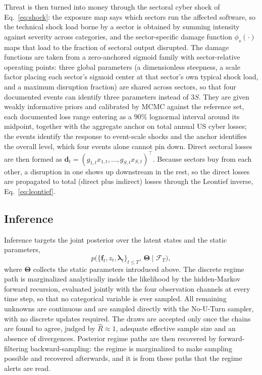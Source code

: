 \documentclass[review]{elsarticle}
\begin{document}
Threat is then turned into money through the sectoral cyber shock of Eq.~\ref{eq:shock}: the exposure map says which sectors run the affected software, so the technical shock load borne by a sector is obtained by summing intensity against severity across categories, and the sector-specific damage function $\phi_s(\cdot)$ maps that load to the fraction of sectoral output disrupted. The damage functions are taken from a zero-anchored sigmoid family with sector-relative operating points: three global parameters (a dimensionless steepness, a scale factor placing each sector's sigmoid center at that sector's own typical shock load, and a maximum disruption fraction) are shared across sectors, so that four documented events can identify three parameters instead of $3S$. They are given weakly informative priors and calibrated by MCMC against the reference set, each documented loss range entering as a $90\%$ lognormal interval around its midpoint, together with the aggregate anchor on total annual US cyber losses; the events identify the response to event-scale shocks and the anchor identifies the overall level, which four events alone cannot pin down. Direct sectoral losses are then formed as $\bm{d}_t = (g_{1,t} x_{1,t}, \dots, g_{S,t} x_{S,t})^\top$. Because sectors buy from each other, a disruption in one shows up downstream in the rest, so the direct losses are propagated to total (direct plus indirect) losses through the Leontief inverse, Eq.~\ref{eq:leontief}.

\subsection{Inference}

Inference targets the joint posterior over the latent states and the static parameters,
\[
    p\big( \{\bm{f}_t, z_t, \bm{\lambda}_t\}_{t \le T},\, \bm{\Theta} \mid \mathcal{F}_T \big),
\]
where $\bm{\Theta}$ collects the static parameters introduced above. The discrete regime path is marginalized analytically inside the likelihood by the hidden-Markov forward recursion, evaluated jointly with the four observation channels at every time step, so that no categorical variable is ever sampled. All remaining unknowns are continuous and are sampled directly with the No-U-Turn sampler, with no discrete updates required. The draws are accepted only once the chains are found to agree, judged by $\widehat{R} \approx 1$, adequate effective sample size and an absence of divergences. Posterior regime paths are then recovered by forward-filtering backward-sampling: the regime is marginalized to make sampling possible and recovered afterwards, and it is from these paths that the regime alerts are read.
\end{document}
